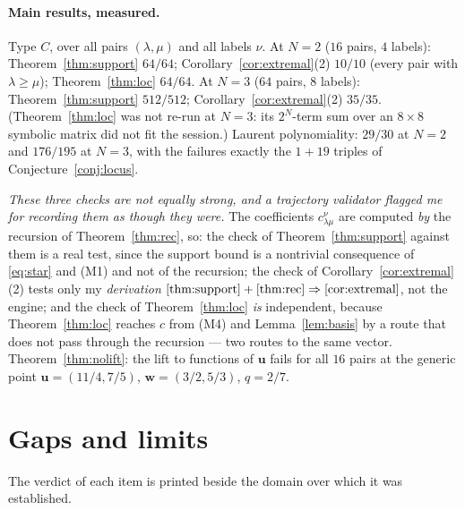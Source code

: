 \documentclass[11pt]{article}
\theoremstyle{plain}
\theoremstyle{definition}
\theoremstyle{remark}
\newcommand{\bu}{\mathbf{u}}
\newcommand{\bw}{\mathbf{w}}
\begin{document}
\paragraph{Main results, measured.}
Type $C$, over all pairs $(\lambda,\mu)$ and all labels $\nu$.
At $N=2$ ($16$ pairs, $4$ labels): Theorem~\ref{thm:support} $64/64$;
Corollary~\ref{cor:extremal}(2) $10/10$ (every pair with $\lambda\ge\mu$);
Theorem~\ref{thm:loc} $64/64$.
At $N=3$ ($64$ pairs, $8$ labels): Theorem~\ref{thm:support} $512/512$;
Corollary~\ref{cor:extremal}(2) $35/35$.  (Theorem~\ref{thm:loc} was not re-run
at $N=3$: its $2^N$-term sum over an $8\times8$ symbolic matrix did not fit the
session.)
Laurent polynomiality: $29/30$ at $N=2$ and $176/195$ at $N=3$, with the
failures exactly the $1+19$ triples of Conjecture~\ref{conj:locus}.

\emph{These three checks are not equally strong, and a trajectory validator
flagged me for recording them as though they were.}  The coefficients
$c^{\nu}_{\lambda\mu}$ are computed \emph{by} the recursion of
Theorem~\ref{thm:rec}, so: the check of Theorem~\ref{thm:support} against them is
a real test, since the support bound is a nontrivial consequence of
\eqref{eq:star} and (M1) and not of the recursion; the check of
Corollary~\ref{cor:extremal}(2) tests only my \emph{derivation}
$\ref{thm:support}+\ref{thm:rec}\Rightarrow\ref{cor:extremal}$, not the engine;
and the check of Theorem~\ref{thm:loc} \emph{is} independent, because
Theorem~\ref{thm:loc} reaches $c$ from (M4) and Lemma~\ref{lem:basis} by a route
that does not pass through the recursion --- two routes to the same vector.
Theorem~\ref{thm:nolift}: the lift to functions of $\bu$ fails for all $16$
pairs at the generic point $\bu=(11/4,7/5)$, $\bw=(3/2,5/3)$, $q=2/7$.

\section{Gaps and limits}

The verdict of each item is printed beside the domain over which it was
established.
\end{document}
